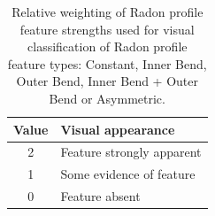 \begin{table}
    \centering
    \begin{tabular}{cl}
    \hline
    Value & Visual appearance \\
    \hline
    2 & Feature strongly apparent \\
    1 & Some evidence of feature \\
    0 & Feature absent \\
    \hline
    \end{tabular}
    \caption{Relative weighting of Radon profile feature strengths used for visual classification of Radon profile feature types: Constant, Inner Bend, Outer Bend, Inner Bend + Outer Bend or Asymmetric.}
    \label{tab:features}
\end{table}